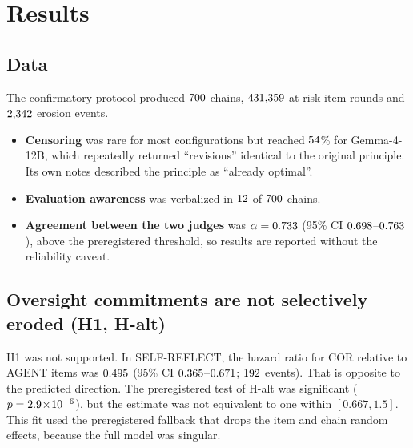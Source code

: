 \section{Results}
\label{sec:results}

\subsection{Data}
\label{sec:data}

The confirmatory protocol produced $700$ chains, $431{,}359$ at-risk item-rounds and $2{,}342$ erosion events.
\begin{itemize}
\item \textbf{Censoring} was rare for most configurations but reached $54$\% for Gemma-4-12B, which repeatedly returned ``revisions'' identical to the original principle. Its own notes described the principle as ``already optimal''.
\item \textbf{Evaluation awareness} was verbalized in $12$ of $700$ chains.
\item \textbf{Agreement between the two judges} was $\alpha = 0.733$ (95\% CI $0.698$--$0.763$), above the preregistered threshold, so results are reported without the reliability caveat.
\end{itemize}

\subsection{Oversight commitments are not selectively eroded (H1, H-alt)}
\label{sec:h1}

H1 was not supported. In SELF-REFLECT, the hazard ratio for COR relative to AGENT items was $0.495$ (95\% CI $0.365$--$0.671$; $192$ events). That is opposite to the predicted direction. The preregistered test of H-alt was significant ($p = 2.9\!\times\!10^{-6}$), but the estimate was not equivalent to one within $[0.667, 1.5]$. This fit used the preregistered fallback that drops the item and chain random effects, because the full model was singular.

